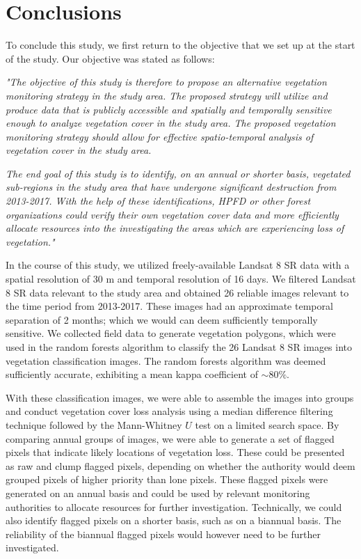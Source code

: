 \section{Conclusions}

\justify
To conclude this study, we first return to the objective that we set up at the start of the study. Our objective was stated as follows:

\justify
\textit{"The objective of this study is therefore to propose an alternative vegetation monitoring strategy in the study area. The proposed strategy will utilize and produce data that is publicly accessible and spatially and temporally sensitive enough to analyze vegetation cover in the study area. The proposed vegetation monitoring strategy should allow for effective spatio-temporal analysis of vegetation cover in the study area.}

\justify
\textit{The end goal of this study is to identify, on an annual or shorter basis, vegetated sub-regions in the study area that have undergone significant destruction from 2013-2017. With the help of these identifications, HPFD or other forest organizations could verify their own vegetation cover data and more efficiently allocate resources into the investigating the areas which are experiencing loss of vegetation."}

\justify
In the course of this study, we utilized freely-available Landsat 8 SR data with a spatial resolution of 30 m and temporal resolution of 16 days. We filtered Landsat 8 SR data relevant to the study area and obtained 26 reliable images relevant to the time period from 2013-2017. These images had an approximate temporal separation of 2 months; which we would can deem sufficiently temporally sensitive. We collected field data to generate vegetation polygons, which were used in the random forests algorithm to classify the 26 Landsat 8 SR images into vegetation classification images. The random forests algorithm was deemed sufficiently accurate, exhibiting a mean kappa coefficient of $\sim$80$\%$.

\justify
With these classification images, we were able to assemble the images into groups and conduct vegetation cover loss analysis using a median difference filtering technique followed by the Mann-Whitney $U$ test on a limited search space. By comparing annual groups of images, we were able to generate a set of flagged pixels that indicate likely locations of vegetation loss. These could be presented as raw and clump flagged pixels, depending on whether the authority would deem grouped pixels of higher priority than lone pixels. These flagged pixels were generated on an annual basis and could be used by relevant monitoring authorities to allocate resources for further investigation. Technically, we could also identify flagged pixels on a shorter basis, such as on a biannual basis. The reliability of the biannual flagged pixels would however need to be further investigated.

